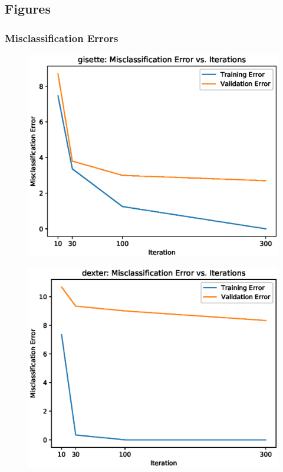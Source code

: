 \documentclass[UTF8]{article}
\begin{document}
\subsection{Figures}
\subsubsection{Misclassification Errors}
\begin{figure}[H]
    \centering
    \includegraphics[scale=0.9]{./figures/gisette-error.eps}
\end{figure}
\begin{figure}[H]
    \centering
    \includegraphics[scale=0.9]{./figures/dexter-error.eps}
\end{figure}
\end{document}
